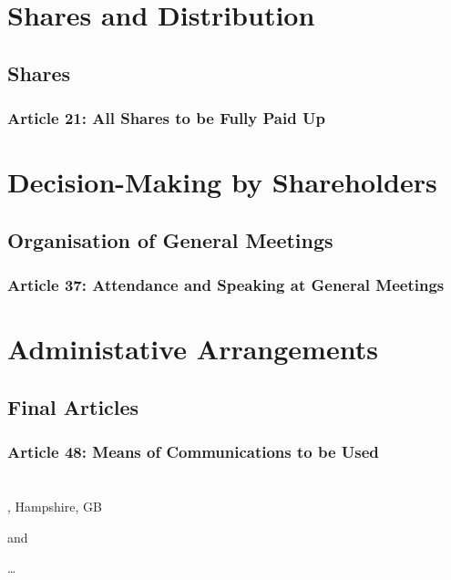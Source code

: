 \documentclass[letterpaper,10pt,openany,oneside,english]{sphinxmanual}
\begin{document}
\chapter{Shares and Distribution}
\label{\detokenize{shares:shares-and-distribution}}\label{\detokenize{shares::doc}}

\section{Shares}
\label{\detokenize{shares:shares}}

\subsection{Article 21: All Shares to be Fully Paid Up}
\label{\detokenize{shares:article-21-all-shares-to-be-fully-paid-up}}

\chapter{Decision-Making by Shareholders}
\label{\detokenize{decisionmaking:decision-making-by-shareholders}}\label{\detokenize{decisionmaking::doc}}

\section{Organisation of General Meetings}
\label{\detokenize{decisionmaking:organisation-of-general-meetings}}

\subsection{Article 37: Attendance and Speaking at General Meetings}
\label{\detokenize{decisionmaking:article-37-attendance-and-speaking-at-general-meetings}}

\chapter{Administative Arrangements}
\label{\detokenize{administrativearrangements:administative-arrangements}}\label{\detokenize{administrativearrangements::doc}}

\section{Final Articles}
\label{\detokenize{administrativearrangements:final-articles}}

\subsection{Article 48: Means of Communications to be Used}
\label{\detokenize{administrativearrangements:article-48-means-of-communications-to-be-used}}

\chapter{}
\label{\detokenize{index:document-author-s}}
, Hampshire, GB

and

 …



\renewcommand{\indexname}{Index}
\printindex
\end{document}
